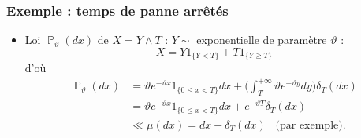 ﻿\documentclass{beamer}
\DeclareMathOperator{\R}{{\mathbb R}}
\DeclareMathOperator{\PP}{{\mathbb P}}
\begin{document}
%
%
%
\begin{frame}
\frametitle{Exemple : temps de panne \og arrêtés\fg{}}
\begin{itemize}
\item \underline{Loi $\PP_\vartheta(dx)$ de $X = Y \wedge T$} : $Y \sim$ exponentielle de paramètre $\vartheta$ :
$$\boxed{X = Y 1_{\{Y < T\}} + T 1_{\{Y \geq T\}}}$$
d'où
\begin{align*}\PP_\vartheta(dx) &
= \vartheta e^{-\vartheta x} 1_{\{0 \leq x < T\}} dx+ \big(\int_{T}^{+\infty}\vartheta e^{-\vartheta y}dy\big) \delta_T(dx)\\
&= \vartheta e^{-\vartheta x} 1_{\{0 \leq x < T\}}dx + e^{-\vartheta T} \delta_T(dx) \\
&\ll \mu(dx) = dx + \delta_T(dx)\;\;\; \text{(par exemple)}.
\end{align*}
\end{itemize}
\end{frame}
\end{document}
